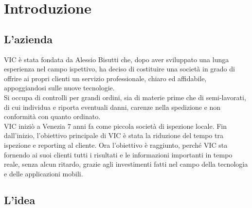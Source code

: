 
\chapter{Introduzione}
\label{cap:introduzione}
\section{L'azienda}

VIC è stata fondata da Alessio Bisutti che, dopo aver sviluppato una lunga esperienza nel campo ispettivo, ha deciso di costituire una società in grado di offrire ai propri clienti un servizio professionale, chiaro ed affidabile, appoggiandosi sulle nuove tecnologie.\\
Si occupa di controlli per grandi ordini, sia di materie prime che di semi-lavorati, di cui individua e riporta eventuali danni, carenze nella spedizione e non conformità con quanto ordinato.\\
VIC iniziò a Venezia 7 anni fa come piccola società di ispezione locale. Fin dall'inizio, l'obiettivo principale di VIC è stata la riduzione del tempo tra ispezione e reporting al cliente. Ora l'obiettivo è raggiunto, perché VIC sta fornendo ai suoi clienti tutti i risultati e le informazioni importanti in tempo reale, senza alcun ritardo, grazie agli investimenti fatti nel campo della tecnologia e delle applicazioni mobili.

\section{L'idea}

